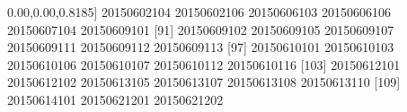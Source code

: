 \documentclass[
]{book}
\newenvironment{Shaded}{\begin{snugshade}}{\end{snugshade}}
\newcommand{\DecValTok}[1]{\textcolor[rgb]{0.00,0.00,0.81}{#1}}
\newcommand{\NormalTok}[1]{#1}
\begin{document}
\begin{Shaded}
\begin{Highlighting}[]
\NormalTok{ [}\DecValTok{85}\NormalTok{] }\DecValTok{20150602104} \DecValTok{20150602106} \DecValTok{20150606103} \DecValTok{20150606106} \DecValTok{20150607104} \DecValTok{20150609101}
\NormalTok{ [}\DecValTok{91}\NormalTok{] }\DecValTok{20150609102} \DecValTok{20150609105} \DecValTok{20150609107} \DecValTok{20150609111} \DecValTok{20150609112} \DecValTok{20150609113}
\NormalTok{ [}\DecValTok{97}\NormalTok{] }\DecValTok{20150610101} \DecValTok{20150610103} \DecValTok{20150610106} \DecValTok{20150610107} \DecValTok{20150610112} \DecValTok{20150610116}
\NormalTok{[}\DecValTok{103}\NormalTok{] }\DecValTok{20150612101} \DecValTok{20150612102} \DecValTok{20150613105} \DecValTok{20150613107} \DecValTok{20150613108} \DecValTok{20150613110}
\NormalTok{[}\DecValTok{109}\NormalTok{] }\DecValTok{20150614101} \DecValTok{20150621201} \DecValTok{20150621202}
\end{Highlighting}
\end{Shaded}
\end{document}

